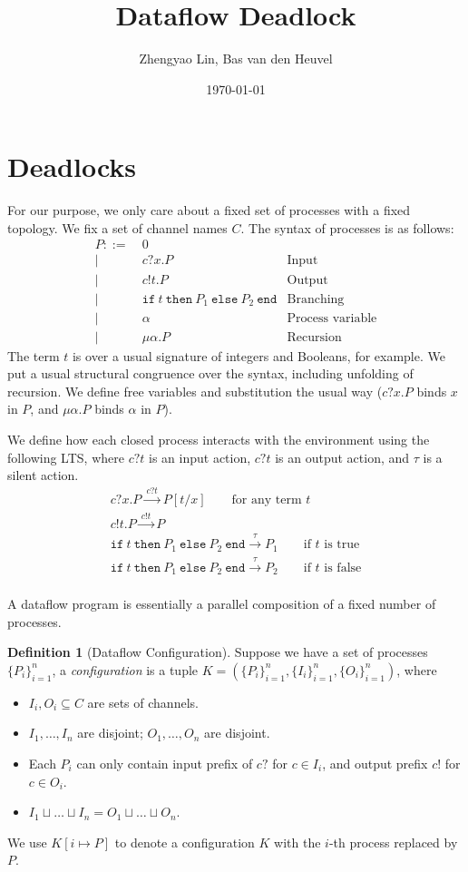 \documentclass{article}
\title{Dataflow Deadlock}
\author{Zhengyao Lin, Bas van den Heuvel}
\date{\today}
\theoremstyle{definition}
\newtheorem{definition}{Definition}
\newcommand{\ite}[3]{\texttt{if}\ #1\ \texttt{then}\ #2\ \texttt{else}\ #3\ \texttt{end}}
\newcommand{\trans}[1]{\xrightarrow{\ #1\ }}
\begin{document}
\maketitle

\section{Deadlocks}

For our purpose, we only care about a fixed set of processes with a fixed topology.
We fix a set of channel names $C$.
The syntax of processes is as follows:
\begin{align*}
    P ::=&\ 0 \\
        |&\ c?x. P & \text{Input} \\
        |&\ c!t. P & \text{Output} \\
        |&\ \ite{t}{P_1}{P_2} & \text{Branching} \\
        |&\ \alpha & \text{Process variable} \\
        |&\ \mu \alpha. P & \text{Recursion}
\end{align*}
The term $t$ is over a usual signature of integers and Booleans, for example.
We put a usual structural congruence over the syntax, including unfolding of recursion.
We define free variables and substitution the usual way ($c?x. P$ binds $x$ in $P$, and $\mu \alpha. P$ binds $\alpha$ in $P$).

We define how each closed process interacts with the environment using the following LTS, where $c?t$ is an input action, $c?t$ is an output action, and $\tau$ is a silent action.
\begin{gather*}
    c?x. P \trans{c?t} P[t/x] \qquad \text{for any term $t$} \\
    c!t. P \trans{c!t} P \\
    \ite{t}{P_1}{P_2} \trans{\tau} P_1 \qquad \text{if $t$ is true} \\
    \ite{t}{P_1}{P_2} \trans{\tau} P_2 \qquad \text{if $t$ is false} \\
\end{gather*}

A dataflow program is essentially a parallel composition of a fixed number of processes.
\begin{definition}[Dataflow Configuration]
    Suppose we have a set of processes $\{ P_i \}^n_{i = 1}$, a \emph{configuration} is a tuple $K = (\{ P_i \}^n_{i = 1}, \{ I_i \}^n_{i = 1}, \{ O_i \}^n_{i = 1})$, where
    \begin{itemize}
        \item $I_i, O_i \subseteq C$ are sets of channels.
        \item $I_1, \dots, I_n$ are disjoint; $O_1, \dots, O_n$ are disjoint.
        \item Each $P_i$ can only contain input prefix of $c?$ for $c \in I_i$, and output prefix $c!$ for $c \in O_i$.
        \item $I_1 \sqcup \dots \sqcup I_n = O_1 \sqcup \dots \sqcup O_n$.
    \end{itemize}
\end{definition}
We use $K[i \mapsto P]$ to denote a configuration $K$ with the $i$-th process replaced by $P$.
\end{document}
